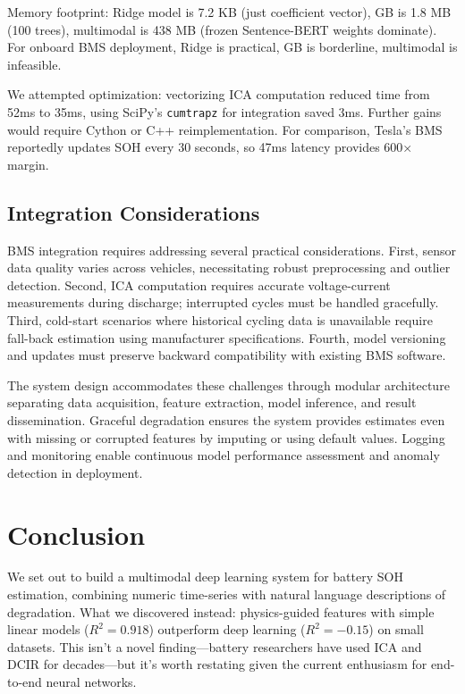 \documentclass{sn-jnl}
\begin{document}
Memory footprint: Ridge model is 7.2 KB (just coefficient vector), GB is 1.8 MB (100 trees), multimodal is 438 MB (frozen Sentence-BERT weights dominate). For onboard BMS deployment, Ridge is practical, GB is borderline, multimodal is infeasible.

We attempted optimization: vectorizing ICA computation reduced time from 52ms to 35ms, using SciPy's \texttt{cumtrapz} for integration saved 3ms. Further gains would require Cython or C++ reimplementation. For comparison, Tesla's BMS reportedly updates SOH every 30 seconds, so 47ms latency provides 600× margin.

\subsection{Integration Considerations}
\label{subsec:integration}

BMS integration requires addressing several practical considerations. First, sensor data quality varies across vehicles, necessitating robust preprocessing and outlier detection. Second, ICA computation requires accurate voltage-current measurements during discharge; interrupted cycles must be handled gracefully. Third, cold-start scenarios where historical cycling data is unavailable require fall-back estimation using manufacturer specifications. Fourth, model versioning and updates must preserve backward compatibility with existing BMS software.

The system design accommodates these challenges through modular architecture separating data acquisition, feature extraction, model inference, and result dissemination. Graceful degradation ensures the system provides estimates even with missing or corrupted features by imputing or using default values. Logging and monitoring enable continuous model performance assessment and anomaly detection in deployment.

\section{Conclusion}
\label{sec:conclusion}

We set out to build a multimodal deep learning system for battery SOH estimation, combining numeric time-series with natural language descriptions of degradation. What we discovered instead: physics-guided features with simple linear models ($R^2 = 0.918$) outperform deep learning ($R^2 = -0.15$) on small datasets. This isn't a novel finding—battery researchers have used ICA and DCIR for decades—but it's worth restating given the current enthusiasm for end-to-end neural networks.
\end{document}
